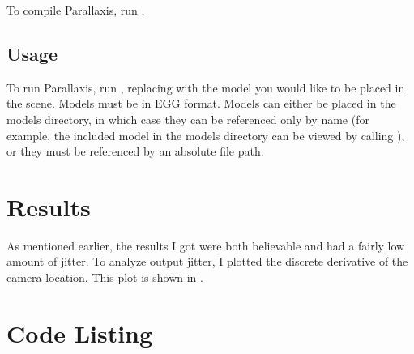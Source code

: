 To compile Parallaxis, run .

\subsection{Usage}
To run Parallaxis, run , replacing
\code{[model]} with the model you would like to be placed in the
scene. Models must be in EGG format. Models can either be placed in
the models directory, in which case they can be referenced only by
name (for example, the included model  in the models
directory can be viewed by calling ), or they
must be referenced by an absolute file path.

\section{Results}

As mentioned earlier, the results I got were both believable and had a
fairly low amount of jitter. To analyze output jitter, I plotted the
discrete derivative of the camera location. This plot is shown in
. 

\section{Code Listing}





